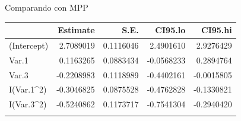 \documentclass[
  11pt,
  ignorenonframetext,
]{beamer}
\newenvironment{Shaded}{}{}
\newcommand{\DecValTok}[1]{\textcolor[rgb]{0.25,0.63,0.44}{#1}}
\newcommand{\FunctionTok}[1]{\textcolor[rgb]{0.02,0.16,0.49}{#1}}
\newcommand{\NormalTok}[1]{#1}
\newcommand{\SpecialCharTok}[1]{\textcolor[rgb]{0.25,0.44,0.63}{#1}}
\begin{document}
\begin{frame}[fragile]{Comparando con MPP}
\protect\hypertarget{comparando-con-mpp}{}
\begin{Shaded}
\end{Shaded}

\begin{longtable}[]{@{}lrrrr@{}}
\toprule\noalign{}
& Estimate & S.E. & CI95.lo & CI95.hi \\
\midrule\noalign{}
\endhead
(Intercept) & 2.7089019 & 0.1116046 & 2.4901610 & 2.9276429 \\
Var.1 & 0.1163265 & 0.0883434 & -0.0568233 & 0.2894764 \\
Var.3 & -0.2208983 & 0.1118989 & -0.4402161 & -0.0015805 \\
I(Var.1\^{}2) & -0.3046825 & 0.0875528 & -0.4762828 & -0.1330821 \\
I(Var.3\^{}2) & -0.5240862 & 0.1173717 & -0.7541304 & -0.2940420 \\
\bottomrule\noalign{}
\end{longtable}
\end{frame}
\end{document}
